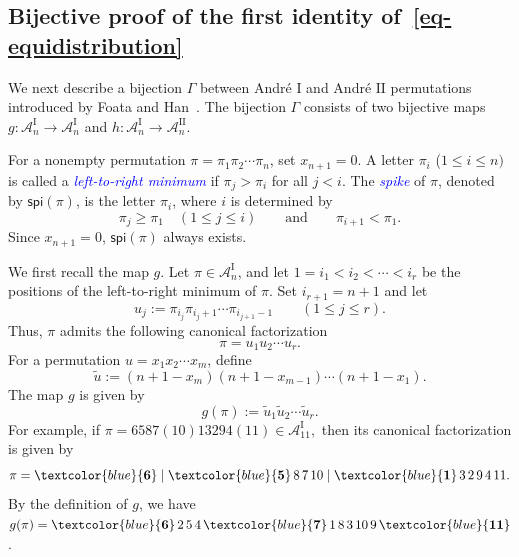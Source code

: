 \documentclass[12pt]{article}
\def\blue{\textcolor{blue}}
\def\blue{\textcolor{blue}}
\numberwithin{equation}{section}
\def\blue{\textcolor{blue}}
\def\blue{\textcolor{blue}}
\theoremstyle{plain}
\providecommand{\spi}{\mathsf{spi}}
\begin{document}
   		  
   	\subsection{Bijective proof of the first identity of~\eqref{eq-equidistribution}}	  
   		
   			
   			
   			We next describe a bijection $\Gamma$ between Andr\'e $\mathrm{I}$ and Andr\'e  $\mathrm{II}$
   			permutations introduced by  Foata and Han~\cite{FH16}.  The bijection $\Gamma$ consists of two bijective maps $g\colon \mathcal{A}_n^{\mathrm{I}}\to \mathcal{A}_n^{\mathrm{I}}$ and $h\colon \mathcal{A}_n^{\mathrm{I}}\to \mathcal{A}_n^{\mathrm{II}}$.
   			
   			For a nonempty permutation \(\pi=\pi_1\pi_2\cdots \pi_n\), set \(x_{n+1}=0\). A  letter $\pi_i$ ($1\leq i\leq n)$ is called a \blue{\em left-to-right  minimum} if $\pi_j>\pi_i$ for all $j<i$.  
   			The \blue{\em spike} of $\pi$, denoted by \(\spi(\pi)\), is the letter \(\pi_i\),
   			where \(i\) is determined by
   			\[
   			\pi_j\geq \pi_1\quad(1\leq j\leq i)
   			\qquad\text{and}\qquad
   			\pi_{i+1}<\pi_1.
   			\]
   		Since 	\(x_{n+1}=0\), \(\spi(\pi)\) always exists. 
		
   			We first recall the map \(g\). Let
   			\(\pi\in\mathcal{A}_n^{\mathrm{I}}\), and let
   			\(1=i_1<i_2<\cdots<i_r\) be the positions of the left-to-right minimum  of
   			\(\pi\). 
   			Set \(i_{r+1}=n+1\) and let
   			\[
   			u_j:=\pi_{i_j}\pi_{i_j+1}\cdots\pi_{i_{j+1}-1}
   			\qquad (1\leq j\leq r).
   			\]
   			Thus, \(\pi\) admits the following canonical factorization 
   			\[
   			\pi=u_1u_2\cdots u_r.
   			\]
   			  For a permutation 
   			\(u=x_1x_2\cdots x_m\), define
   			\[
   			\tilde{u}:=(n+1-x_m)(n+1-x_{m-1})\cdots(n+1-x_1).
   			\]
   			The map \(g\) is given by
   			\[
   			g(\pi):=\tilde{u}_1\tilde{u}_2\cdots\tilde{u}_r.
   			\]
   		For example, if  
   			$
   			\pi=6587(10)13294(11)
   			\in\mathcal{A}_{11}^{\mathrm{I}},
   			$
   			then its canonical factorization is given by 
   			\[
   			\pi=\blue{\bf6}\mid \blue{\bf5}\,8\,7\,10\mid \blue{\bf1}\,3\,2\,9\,4\,11.
   			\]
   			By the  definition of \(g\), we have $g(\pi)=\blue{\bf6}\,2\,5\,4\,\blue{\bf7}\,1\,8\,3\,10\,9\,\blue{\bf11}$. 
   			
   		 
   				
   		 
   			
\end{document}
